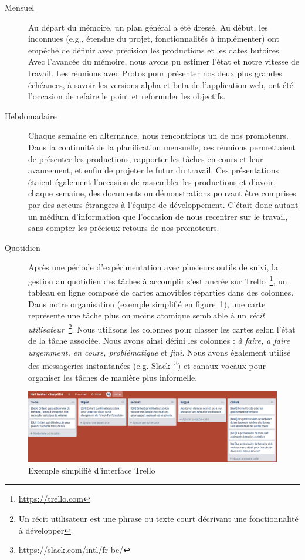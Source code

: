 \documentclass{EPL-master-thesis-covers-FR}
\begin{document}
				\begin{description}
					\item[Mensuel] Au départ du mémoire, un plan général a été dressé. Au début, les inconnues (e.g., étendue du projet, fonctionnalités à implémenter) ont empêché de définir avec précision les productions et les dates butoires. Avec l'avancée du mémoire, nous avons pu estimer l'état et notre vitesse de travail. Les réunions avec Protos pour présenter nos deux plus grandes échéances, à savoir les versions alpha et beta de l'application web, ont été l'occasion de refaire le point et reformuler les objectifs.

					\item[Hebdomadaire] Chaque semaine en alternance, nous rencontrions un de nos promoteurs. Dans la continuité de la planification mensuelle, ces réunions permettaient de présenter les productions, rapporter les tâches en cours et leur avancement, et enfin de projeter le futur du travail. Ces présentations étaient également l'occasion de rassembler les productions et d'avoir, chaque semaine, des documents ou démonstrations pouvant être comprises par des acteurs étrangers à l'équipe de développement. C'était donc autant un médium d'information que l'occasion de nous recentrer sur le travail, sans compter les précieux retours de nos promoteurs.

					\item[Quotidien] Après une période d'expérimentation avec plusieurs outils de suivi, la gestion au quotidien des tâches à accomplir s'est ancrée sur Trello~\footnote{\url{https://trello.com}}, un tableau en ligne composé de cartes amovibles réparties dans des colonnes. Dans notre organisation (exemple simplifié en figure~\ref{fig:screen_trello_simplifie}), une carte représente une tâche plus ou moins atomique semblable à un \emph{récit utilisateur}~\footnote{Un récit utilisateur est une phrase ou texte court décrivant une fonctionnalité à développer}. Nous utilisons les colonnes pour classer les cartes selon l'état de la tâche associée. Nous avons ainsi défini les colonnes : \emph{à faire, a faire urgemment, en cours, problématique} et \emph{fini}. Nous avons également utilisé des messageries instantanées (e.g. Slack~\footnote{\url{https://slack.com/intl/fr-be/}}) et canaux vocaux pour organiser les tâches de manière plus informelle.
				\end{description}

				\begin{figure}[H]
					\includegraphics[width=\textwidth]{images/screen_trello_simplifie}
					\caption{Exemple simplifié d'interface Trello}
					\label{fig:screen_trello_simplifie}
				\end{figure}
\end{document}
